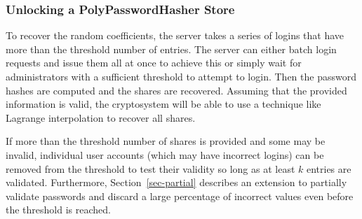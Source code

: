 \subsubsection{Unlocking a PolyPasswordHasher Store}

To recover the random coefficients, the server takes a series of logins that 
have more than the threshold number of entries.   
The server can either batch login requests and issue them all at once to
achieve this or simply wait for administrators with a sufficient threshold to 
attempt to login.   Then the password hashes are computed and the shares
are recovered.   Assuming that the provided information is valid, the 
cryptosystem will be able to use a technique like Lagrange interpolation to
recover all shares.

If more than the threshold number of shares is provided and some may be
invalid, individual user accounts (which may have 
incorrect logins) can be removed from the threshold to test their validity
so long as at least $k$ entries are validated.   %
Furthermore, 
Section~\ref{sec-partial} describes an extension to partially validate 
passwords and discard a large percentage of incorrect values even before 
the threshold is reached.



